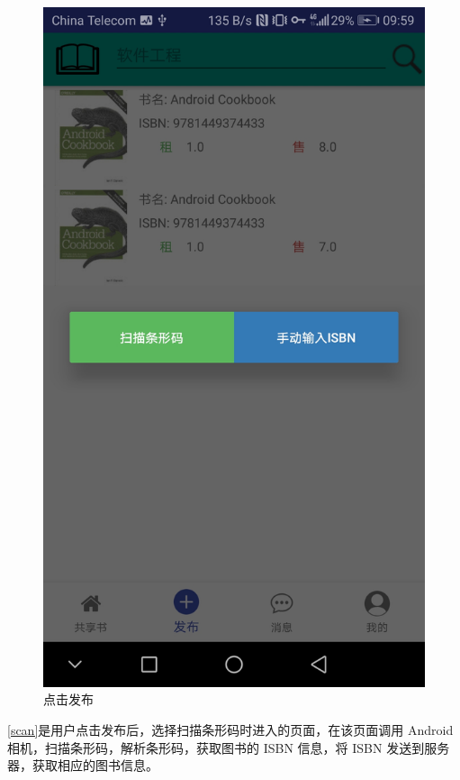 \begin{figure}[h]
	\centering
	\includegraphics[scale=0.09]{Chapters/UI/release.jpg}
	\caption{点击发布}
	\label{release}
\end{figure}

\cref{scan}是用户点击发布后，选择扫描条形码时进入的页面，在该页面调用 Android
相机，扫描条形码，解析条形码，获取图书的 ISBN 信息，将 ISBN 发送到服务器，获取相应的图书信息。

